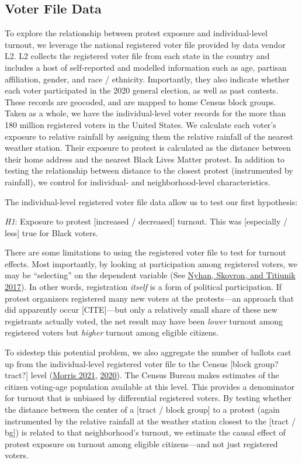 \documentclass[
  12pt,
]{article}
\begin{document}
\hypertarget{voter-file-data}{%
\subsection*{Voter File Data}\label{voter-file-data}}

To explore the relationship between protest exposure and individual-level turnout, we leverage the national registered voter file provided by data vendor L2. L2 collects the registered voter file from each state in the country and includes a host of self-reported and modelled information such as age, partisan affiliation, gender, and race / ethnicity. Importantly, they also indicate whether each voter participated in the 2020 general election, as well as past contests. These records are geocoded, and are mapped to home Census block groups. Taken as a whole, we have the individual-level voter records for the more than 180 million registered voters in the United States. We calculate each voter's exposure to relative rainfall by assigning them the relative rainfall of the nearest weather station. Their exposure to protest is calculated as the distance between their home address and the nearest Black Lives Matter protest. In addition to testing the relationship between distance to the closest protest (instrumented by rainfall), we control for individual- and neighborhood-level characteristics.

The individual-level registered voter file data allow us to test our first hypothesis:

\emph{H1}: Exposure to protest {[}increased / decreased{]} turnout. This was {[}especially / less{]} true for Black voters.

There are some limitations to using the registered voter file to test for turnout effects. Most importantly, by looking at participation among registered voters, we may be ``selecting'' on the dependent variable (See \protect\hyperlink{ref-Nyhan2017}{Nyhan, Skovron, and Titiunik 2017}). In other words, registration \emph{itself} is a form of political participation. If protest organizers registered many new voters at the protests---an approach that did apparently occur {[}CITE{]}---but only a relatively small share of these new registrants actually voted, the net result may have been \emph{lower} turnout among registered voters but \emph{higher} turnout among eligible citizens.

To sidestep this potential problem, we also aggregate the number of ballots cast up from the individual-level registered voter file to the Census {[}block group? tract?{]} level (\protect\hyperlink{ref-Morris2021}{Morris 2021}, \protect\hyperlink{ref-Morris2020}{2020}). The Census Bureau makes estimates of the citizen voting-age population available at this level. This provides a denominator for turnout that is unbiased by differential registered voters. By testing whether the distance between the center of a {[}tract / block group{]} to a protest (again instrumented by the relative rainfall at the weather station closest to the {[}tract / bg{]}) is related to that neighborhood's turnout, we estimate the causal effect of protest exposure on turnout among eligible citizens---and not just registered voters.
\end{document}
